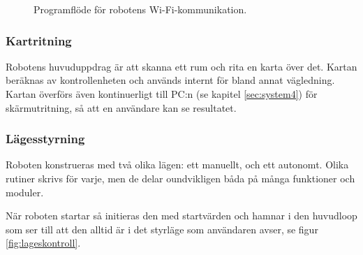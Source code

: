 \documentclass[a4paper,11pt]{article}
\begin{document}
\begin{figure}[h!]
\begin{tikzpicture}[node distance=2cm,scale=0.6, every node/.style={scale=0.6}]
    \end{tikzpicture}
    \caption{Programflöde för robotens Wi-Fi-kommunikation.}
    \label{fig:wifi}
\end{figure}

\subsubsection{Kartritning} \label{sssec:mapping}
Robotens huvuduppdrag är att skanna ett rum och rita en karta över det. Kartan beräknas av kontrollenheten och används internt för bland annat vägledning. Kartan överförs även kontinuerligt till PC:n (se kapitel \ref{sec:system4}) för skärmutritning, så att en användare kan se resultatet.

\clearpage

\subsubsection{Lägesstyrning}
Roboten konstrueras med två olika lägen: ett manuellt, och ett autonomt. Olika rutiner skrivs för varje, men de delar oundvikligen båda på många funktioner och moduler.

När roboten startar så initieras den med startvärden och hamnar i den huvudloop som ser till att den alltid är i det styrläge som användaren avser, se figur \ref{fig:lageskontroll}.
\end{document}
